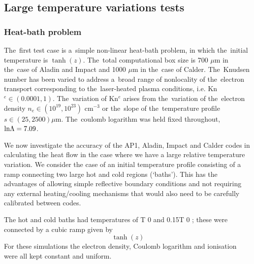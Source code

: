 \subsection{Large temperature variations tests}
\label{sec:SimulationResults}
\subsubsection{Heat-bath problem}
The~first test case is a~simple non-linear heat-bath problem, 
in which the~initial temperature is $\tanh(z)$.  
The~total computational box size is 700 $\mu$m in the~case
of Aladin and Impact and 1000 $\mu$m in the~case of Calder.
The~Knudsen number has been varied to address a~broad range of nonlocality of 
the~electron transport corresponding to the~laser-heated plasma conditions,
i.e. Kn$^e \in (0.0001, 1)$. The~variation of Kn$^e$ arises from the~variation
of the~electron density $n_e \in (10^{19}, 10^{23})$ cm$^{-3}$ or the~slope of 
the~temperature profile $s \in (25, 2500) \mu$m. The~coulomb logarithm was held
fixed throughout, $\text{ln}\Lambda = 7.09$. 

We now investigate the accuracy of the AP1, Aladin, Impact and Calder
codes in calculating the heat flow in the case
where we have a large relative temperature variation.
We consider the case of an initial temperature profile
consisting of a ramp connecting two large hot and cold
regions (‘baths’). This has the advantages of allowing
simple reflective boundary conditions and not requiring
any external heating/cooling mechanisms that would also
need to be carefully calibrated between codes.

The hot and cold baths had temperatures of T 0 and
0.15T 0 ; these were connected by a cubic ramp given by
\begin{equation}
  \tanh(z)
  \nonumber
\end{equation}
For these simulations the electron density, Coulomb logarithm and 
ionisation were all kept constant and uniform.

